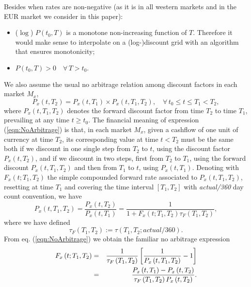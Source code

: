 \documentclass[11pt,reqno]{amsart}
\begin{document}
Besides when rates are non-negative (as it is in all western markets and in the EUR market we consider in this paper):
\begin{itemize}
\item ($\log $) $P(t_0,T)$ is a monotone non-increasing function of $T$. Therefore it would make sense to interpolate on a (log-)discount grid with an algorithm that ensures monotonicity;
\item $P\left(t_0,T\right)>0\quad\forall\,T>t_0$.
\end{itemize}
\par
We also assume the usual no arbitrage relation among discount factors in each market $M_{x}$,
\begin{equation}
P_{x}\left(t,T_{2}\right)
= P_{x}\left(t,T_{1}\right) \times P_{x}\left(t,T_{1},T_{2}\right),
\quad\forall\, t_0 \leq t \leq T_{1}<T_{2},
\label{eqn:NoArbitrage}
\end{equation}
where $P_{x}\left(t,T_{1},T_{2}\right) $ denotes the forward discount factor from time $T_{2}$ to time $T_{1}$, prevailing at any time $t\geq t_0$. The financial meaning of expression (\ref{eqn:NoArbitrage}) is that, in each market $M_{x}$, given a cashflow of one unit of currency at time $T_{2}$, its corresponding value at time $t<T_{2}$ must be the same both if we discount in one single step from $T_{2}$ to $t$, using the discount factor $P_{x}\left(t,T_{2}\right)$, and if we discount in two steps, first from $T_{2}$ to $T_{1}$, using the forward discount $P_{x}\left(t,T_{1},T_{2}\right)$ and then from $T_{1}$ to $t$, using $P_{x}\left(t,T_{1}\right)$. Denoting with $F_{x}\left(t;T_{1},T_{2}\right) $ the simple compounded forward rate associated to $P_{x}\left(t,T_{1},T_{2}\right)$, resetting at time $T_{1}$ and covering the time interval $\left[T_{1},T_{2}\right]$ with \emph{actual/360} day count convention, we have
\begin{equation}
P_{x}\left(t,T_{1},T_{2}\right)
= \frac{P_{x}\left(t,T_{2}\right)}{P_{x}\left(t,T_{1}\right)}
= \frac{1}{1+F_{x}\left(t;T_{1},T_{2}\right)\tau_F\left(T_{1},T_{2}\right) },
\end{equation}
where we have defined
\begin{equation}
\tau_F\left(T_{1},T_{2}\right) := \tau\left(T_{1},T_{2};actual/360\right).
\end{equation}
From eq. (\ref{eqn:NoArbitrage}) we obtain the familiar no arbitrage expression
\begin{eqnarray}
F_{x}\left(t;T_{1},T_{2}\right)
&=& \frac{1}{\tau_F\left(T_{1},T_{2}\right)}\left[\frac{1}{P_{x}\left(t,T_{1},T_{2}\right) }-1\right]   \notag \\
&=& \frac{P_{x}\left(t,T_{1}\right) - P_{x}\left(t,T_{2}\right)}{\tau_F\left(T_{1},T_{2}\right) P_{x}\left(t,T_{2}\right)}.
\label{eqn:FwdRate}
\end{eqnarray}
\end{document}
